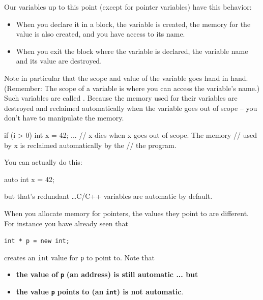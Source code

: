 \newpage{}

Our variables up to this point (except for pointer variables) have this
behavior:

\begin{itemize}

\item
  When you declare it in a block, the variable is created, the memory
  for the value is also created, and you have access to its name.
\item
  When you exit the block where the variable is declared, the variable
  name and its value are destroyed.
\end{itemize}

Note in particular that the scope and value of the variable goes hand in hand. (Remember: The scope of a variable is where you can access the variable's name.) Such variables are called . Because the memory used for their variables are destroyed and reclaimed automatically when the variable goes out of scope -- you don't have to manipulate the memory.

\begin{consolethree}[escapeinside=||]
if (i > 0)
{
    int x = 42;
    ...
}
// x dies when x goes out of scope. The memory
// used by x is reclaimed automatically by the
// the program.
\end{consolethree}
You can actually do this:

\begin{consolethree}[escapeinside=||]
auto int x = 42;
\end{consolethree}

but that's redundant \ldots C/C++ variables are automatic by default.

When you allocate memory for pointers, the values they point to are different. For instance you have already seen that
\begin{center}
\texttt{int * p = new int;}
\end{center}

creates an \texttt{int} value for \texttt{p} to point to. Note that

\begin{itemize}
\item
  \textbf{the value of }\texttt{\textbf{p}}\textbf{ (an address) is still
  automatic ... but }
\item
  \textbf{the value }\texttt{\textbf{p}}\textbf{ points to (an
  }\texttt{\textbf{int}}\textbf{) is not automatic}.
\end{itemize}

